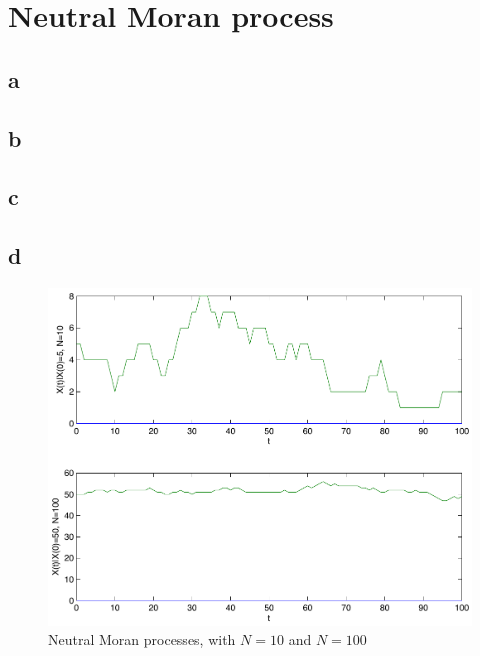 \setcounter{chapter}{4}
\setcounter{section}{0}
\section{Neutral Moran process}
\subsection{a}

\subsection{b}

\subsection{c}

\subsection{d}

\begin{figure}[htbp]
\centering
\includegraphics[scale=0.7]{./images/plot_moran}
\caption{Neutral Moran processes, with $N=10$ and $N=100$}
\label{fig:graph03}
\end{figure}




\setcounter{chapter}{5}
\setcounter{section}{0}
